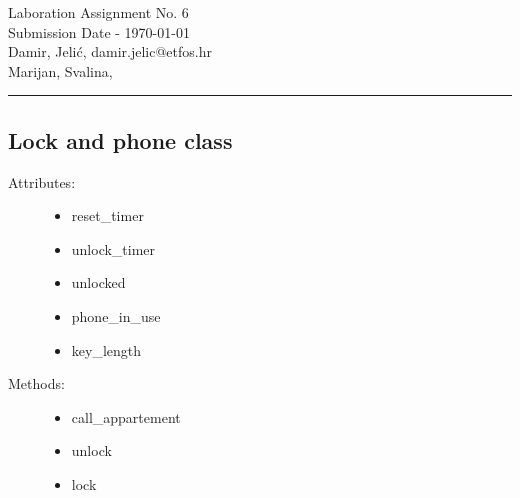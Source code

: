 \documentclass[11pt,a4paper]{article}
\begin{document}
\large
Laboration Assignment No. 6\\
Submission Date - \yyyymmdddate \today \\
Damir, Jelić, damir.jelic@etfos.hr \\
Marijan, Svalina, %
\\
\rule{\linewidth}{0.1mm}

\setcounter{section}{6}
\subsection{Lock and phone class}
\begin{description}
    \item[Attributes:] \hfill
    \begin{itemize}
        \item reset\_timer
        \item unlock\_timer
        \item unlocked
        \item phone\_in\_use
        \item key\_length
    \end{itemize}
    \item[Methods:] \hfill
    \begin{itemize}
        \item call\_appartement
        \item unlock
        \item lock
    \end{itemize}
\end{description}
\end{document}
